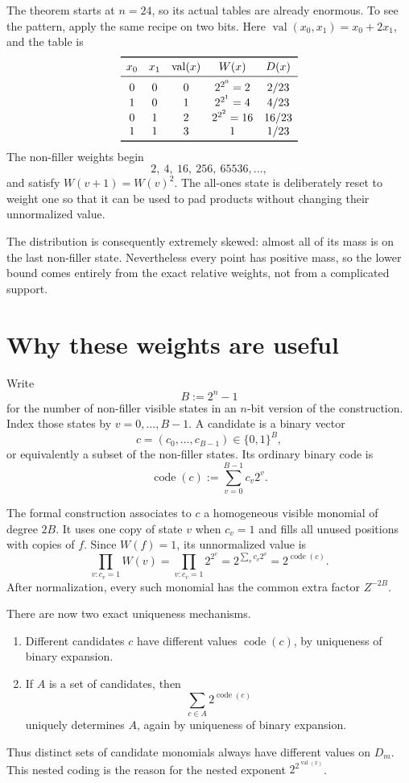 \documentclass[11pt]{article}
\newcommand{\bits}{\{0,1\}}
\newcommand{\val}{\operatorname{val}}
\begin{document}
The theorem starts at $n=24$, so its actual tables are already enormous.  To
see the pattern, apply the same recipe on two bits.  Here
$\val(x_0,x_1)=x_0+2x_1$, and the table is
\[
\begin{array}{ccccc}
\toprule
x_0 & x_1 & \val(x) & W(x) & D(x)\\
\midrule
0&0&0&2^{2^0}=2&2/23\\
1&0&1&2^{2^1}=4&4/23\\
0&1&2&2^{2^2}=16&16/23\\
1&1&3&1&1/23\\
\bottomrule
\end{array}
\]
The non-filler weights begin
\[
  2,\ 4,\ 16,\ 256,\ 65536,\ldots,
\]
and satisfy $W(v+1)=W(v)^2$.  The all-ones state is deliberately reset to
weight one so that it can be used to pad products without changing their
unnormalized value.

The distribution is consequently extremely skewed: almost all of its mass is
on the last non-filler state.  Nevertheless every point has positive mass, so
the lower bound comes entirely from the exact relative weights, not from a
complicated support.

\section{Why these weights are useful}

Write
\[
  B:=2^n-1
\]
for the number of non-filler visible states in an $n$-bit version of the
construction.  Index those states by $v=0,\ldots,B-1$.  A candidate is a
binary vector
\[
  c=(c_0,\ldots,c_{B-1})\in\bits^B,
\]
or equivalently a subset of the non-filler states.  Its ordinary binary code
is
\[
  \operatorname{code}(c):=\sum_{v=0}^{B-1}c_v2^v.
\]

The formal construction associates to $c$ a homogeneous visible monomial of
degree $2B$.  It uses one copy of state $v$ when $c_v=1$ and fills all unused
positions with copies of $f$.  Since $W(f)=1$, its unnormalized value is
\[
  \prod_{v:c_v=1} W(v)
  =\prod_{v:c_v=1}2^{2^v}
  =2^{\sum_v c_v2^v}
  =2^{\operatorname{code}(c)}.
\]
After normalization, every such monomial has the common extra factor
$Z^{-2B}$.

There are now two exact uniqueness mechanisms.
\begin{enumerate}
  \item Different candidates $c$ have different values
  $\operatorname{code}(c)$, by uniqueness of binary expansion.
  \item If $A$ is a set of candidates, then
  \[
    \sum_{c\in A}2^{\operatorname{code}(c)}
  \]
  uniquely determines $A$, again by uniqueness of binary expansion.
\end{enumerate}
Thus distinct sets of candidate monomials always have different values on
$D_m$.  This nested coding is the reason for the nested exponent
$2^{2^{\val(x)}}$.
\end{document}
